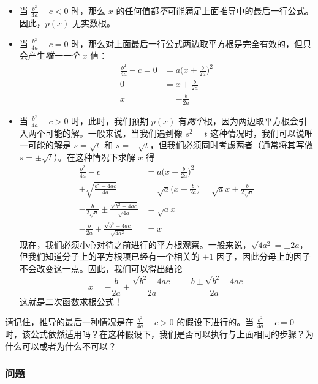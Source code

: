 \begin{itemize}
    \item 当 $\frac{b^2}{4a} -c < 0$ 时，那么 $x$ 的任何值都\textit{不}可能满足上面推导中的最后一行公式。因此，$p(x)$ 无实数根。
    \item 当 $\frac{b^2}{4a} -c = 0$ 时，那么对上面最后一行公式两边取平方根是完全有效的，但只会产生\textit{唯一一个 }$x$ 值：
    \begin{align*}
        \frac{b^2}{4a} -c = 0 &= a\Big(x+\frac{b}{2a}\Big)^2 \\
        0 &= x+\frac{b}{2a} \\
        x &= -\frac{b}{2a}
    \end{align*}
    \item 当 $\frac{b^2}{4a} -c > 0$ 时，此时，我们预期 $p(x)$ 有\textit{两个}根，因为两边取平方根会引入两个可能的解。一般来说，当我们遇到像 $s^2 = t$ 这种情况时，我们可以说唯一可能的解是 $s =\sqrt{t}$ 和 $s = -\sqrt{t}$，但我们必须同时考虑两者（通常将其写做 $s = \pm\sqrt{t}$）。在这种情况下求解 $x$ 得
    \begin{align*}
        \frac{b^2}{4a} -c &= a\Big(x+\frac{b}{2a}\Big)^2 \\
        \pm\sqrt{\frac{b^2-4ac}{4a}} &= \sqrt{a}\Big(x+\frac{b}{2a}\Big) = \sqrt{a}x+\frac{b}{2\sqrt{a}} \\
        -\frac{b}{2\sqrt{a}}\pm\frac{\sqrt{b^2-4ac}}{\sqrt{4a}} &= \sqrt{a}x \\
        -\frac{b}{2a}\pm\frac{\sqrt{b^2-4ac}}{\sqrt{4a^2}} &= x
    \end{align*}
    现在，我们必须小心对待之前进行的平方根观察。一般来说，$\sqrt{4a^2} = \pm2a$，但我们知道分子上的平方根项已经有一个相关的 $\pm1$ 因子，因此分母上的因子不会改变这一点。因此，我们可以得出结论
    \[x = -\frac{b}{2a}\pm\frac{\sqrt{b^2-4ac}}{2a} = \frac{-b\pm\sqrt{b^2-4ac}}{2a}\]
    这就是二次函数求根公式！
\end{itemize}

请记住，推导的最后一种情况是在 $\frac{b^2}{4a} -c > 0$ 的假设下进行的。当 $\frac{b^2}{4a} -c = 0$ 时，该公式依然适用吗？在这种假设下，我们是否可以执行与上面相同的步骤？为什么可以或者为什么不可以？

\subsubsection*{问题}

